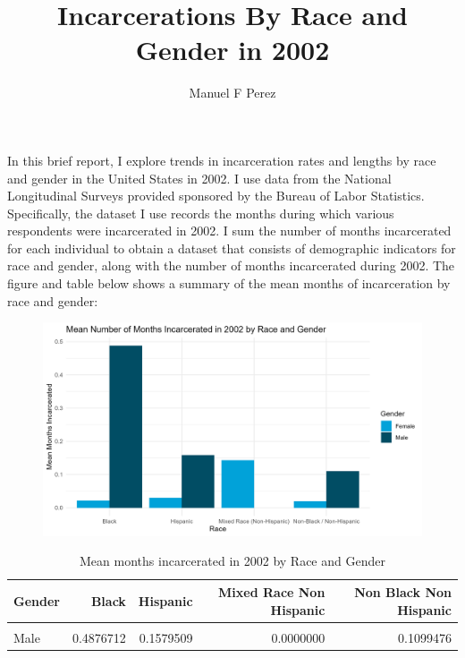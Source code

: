 \documentclass[11pt]{amsart}
\title[title]{Incarcerations By Race and Gender in 2002}
\author{Manuel F Perez}
\numberwithin{equation}{section}
\numberwithin{figure}{section}
\numberwithin{theorem}{section}
\begin{document}
\maketitle

In this brief report, I explore trends in incarceration rates and lengths by race and gender in the United States in 2002. I use data from the National Longitudinal Surveys provided sponsored by the Bureau of Labor Statistics. Specifically, the dataset I use records the months during which various respondents were incarcerated in 2002. I sum the number of months incarcerated for each individual to obtain a dataset that consists of demographic indicators for race and gender, along with the number of months incarcerated during 2002. The figure and table below shows a summary of the mean months of incarceration by race and gender:

\begin{figure}[H]
    \centering
    \includegraphics[scale=0.8]{incarceration_by_racegender.png}
\end{figure}

\begin{table}[H]

\caption{\label{tab:tab:summarystats}Mean months incarcerated in 2002 by Race and Gender}
\centering
\begin{tabular}[t]{lrrrr}
\toprule
Gender & Black & Hispanic & Mixed Race Non Hispanic & Non Black Non Hispanic\\
\midrule
\cellcolor{gray!6}{Female} & \cellcolor{gray!6}{0.0211268} & \cellcolor{gray!6}{0.0298013} & \cellcolor{gray!6}{0.1428571} & \cellcolor{gray!6}{0.0193192}\\
Male & 0.4876712 & 0.1579509 & 0.0000000 & 0.1099476\\
\bottomrule
\end{tabular}
\end{table}
\end{document}
